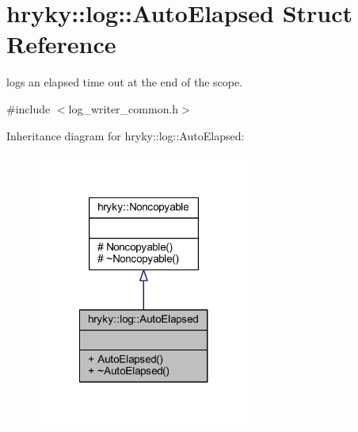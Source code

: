 \hypertarget{structhryky_1_1log_1_1_auto_elapsed}{\section{hryky\-:\-:log\-:\-:Auto\-Elapsed Struct Reference}
\label{structhryky_1_1log_1_1_auto_elapsed}
}


logs an elapsed time out at the end of the scope.  




{\ttfamily \#include $<$log\-\_\-writer\-\_\-common.\-h$>$}



Inheritance diagram for hryky\-:\-:log\-:\-:Auto\-Elapsed\-:\nopagebreak
\begin{figure}[H]
\begin{center}
\leavevmode
\includegraphics[width=200pt]{structhryky_1_1log_1_1_auto_elapsed__inherit__graph}
\end{center}
\end{figure}
